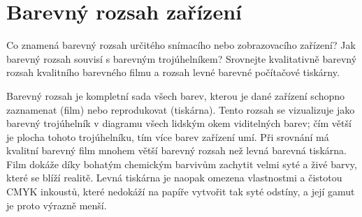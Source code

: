 \section{Barevný rozsah zařízení}
Co znamená barevný rozsah určitého snímacího nebo zobrazovacího zařízení? Jak barevný rozsah souvisí s barevným 
trojúhelníkem? Srovnejte kvalitativně barevný rozsah kvalitního barevného filmu a rozsah levné barevné počítačové 
tiskárny.

Barevný rozsah je kompletní sada všech barev, kterou je dané zařízení schopno zaznamenat (film) nebo 
reprodukovat (tiskárna). Tento rozsah se vizualizuje jako barevný trojúhelník v diagramu všech lidským okem viditelných 
barev; čím větší je plocha tohoto trojúhelníku, tím více barev zařízení umí. Při srovnání má kvalitní barevný film 
mnohem větší barevný rozsah než levná barevná tiskárna. Film dokáže díky bohatým chemickým barvivům zachytit velmi syté 
a živé barvy, které se blíží realitě. Levná tiskárna je naopak omezena vlastnostmi a čistotou CMYK inkoustů, které 
nedokáží na papíře vytvořit tak syté odstíny, a její gamut je proto výrazně menší.
